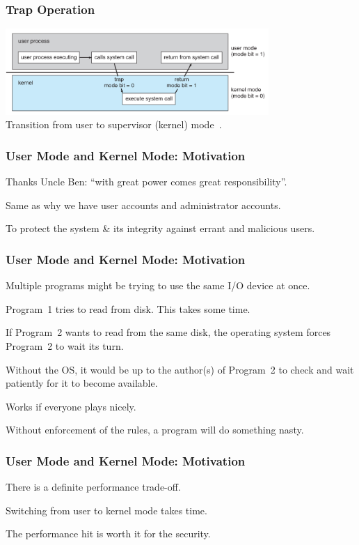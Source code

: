 \begin{frame}
\frametitle{Trap Operation}

\begin{center}
	\includegraphics[width=0.75\textwidth]{images/trap.png}\\
	Transition from user to supervisor (kernel) mode~\cite{osc}.
\end{center}


\end{frame}

\begin{frame}
	\frametitle{User Mode and Kernel Mode: Motivation}


	Thanks Uncle Ben: ``with great power comes great responsibility''.


	Same as why we have user accounts and administrator accounts.

	To protect the system \& its integrity against errant and malicious users.


\end{frame}

\begin{frame}
	\frametitle{User Mode and Kernel Mode: Motivation}

	Multiple programs might be trying to use the same I/O device at once.

	Program~1 tries to read from disk. This takes some time.

	If Program~2 wants to read from the same disk, the operating system forces Program~2 to wait its turn.

	Without the OS, it would be up to the author(s) of Program~2 to check and wait patiently for it to become available.

	Works if everyone plays nicely.

	Without enforcement of the rules, a program will do something nasty.

\end{frame}

\begin{frame}
	\frametitle{User Mode and Kernel Mode: Motivation}

	There is a definite performance trade-off.

	Switching from user to kernel mode takes time.

	The performance hit is worth it for the security.

\end{frame}


